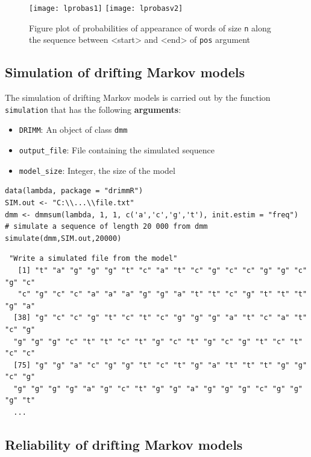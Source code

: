 \documentclass[article,nojss]{jss}\usepackage[]{graphicx}\usepackage[]{color}
\begin{document}
\begin{figure}[htbp]
\centering
\texttt{[image: lprobas1]}
\texttt{[image: lprobasv2]}
\caption{Figure plot of probabilities of appearance of words of size  {\tt n} along the sequence between <start> and <end> of {\tt pos} argument} \label{wordprobas}
\end{figure}


\clearpage

\subsection{Simulation of drifting Markov models} \label{subsection_pack_simul}

The simulation of drifting Markov models is carried out by the function \verb|simulation| that has the following {\bf arguments}:
%
\begin{itemize}
\item {\tt DRIMM}: An object of class {\tt dmm}
\item \verb|output_file|: File containing the simulated sequence
\item \verb|model_size|: Integer, the size of the model
\end{itemize}

\begin{lstlisting}
data(lambda, package = "drimmR")
SIM.out <- "C:\\...\\file.txt"
dmm <- dmmsum(lambda, 1, 1, c('a','c','g','t'), init.estim = "freq")
# simulate a sequence of length 20 000 from dmm
simulate(dmm,SIM.out,20000)
\end{lstlisting}

\begin{lstlisting}
 "Write a simulated file from the model"
   [1] "t" "a" "g" "g" "g" "t" "c" "a" "t" "c" "g" "c" "c" "g" "g" "c" "g" "c"
   "c" "g" "c" "c" "a" "a" "a" "g" "g" "a" "t" "t" "c" "g" "t" "t" "t" "g" "a"
  [38] "g" "c" "c" "g" "t" "c" "t" "c" "g" "g" "g" "a" "t" "c" "a" "t" "c" "g"
  "g" "g" "g" "c" "t" "t" "c" "t" "g" "c" "t" "g" "c" "g" "t" "c" "t" "c" "c"
  [75] "g" "g" "a" "c" "g" "g" "t" "c" "t" "g" "a" "t" "t" "t" "g" "g" "c" "g"
  "g" "g" "g" "g" "a" "g" "c" "t" "g" "g" "a" "g" "g" "g" "c" "g" "g" "g" "t"
  ...
\end{lstlisting}


\clearpage

\subsection{Reliability of drifting Markov models} \label{subsection_pack_reliab}
\end{document}
